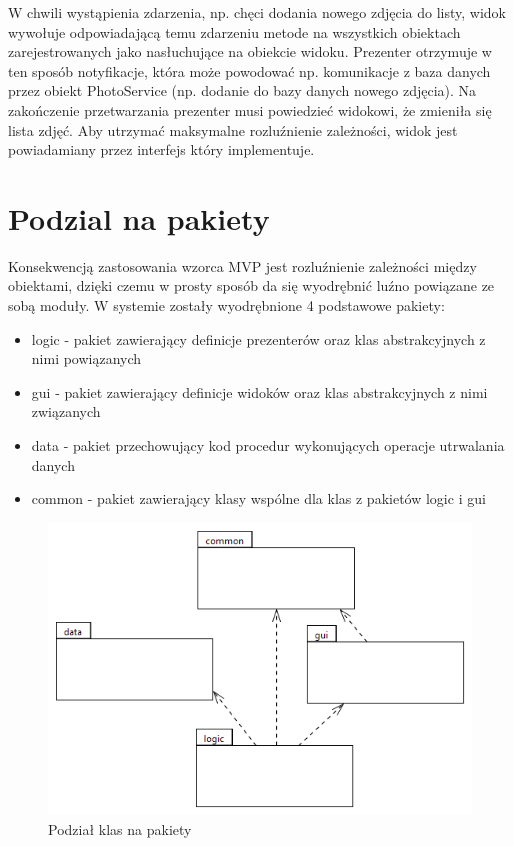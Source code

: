 W chwili wystąpienia zdarzenia, np. chęci dodania nowego zdjęcia do listy, widok wywołuje odpowiadającą temu zdarzeniu metode na wszystkich obiektach zarejestrowanych jako nasłuchujące na obiekcie widoku. Prezenter otrzymuje w ten sposób notyfikacje, która może powodować np. komunikacje z baza danych przez obiekt PhotoService (np. dodanie do bazy danych nowego zdjęcia). Na zakończenie przetwarzania prezenter musi powiedzieć widokowi, że zmieniła się lista zdjęć. Aby utrzymać maksymalne rozluźnienie zależności, widok jest powiadamiany przez interfejs który implementuje.

\section{Podzial na pakiety}
Konsekwencją zastosowania wzorca MVP jest rozluźnienie zależności między obiektami, dzięki czemu w prosty sposób da się wyodrębnić luźno powiązane ze sobą moduły. W systemie zostały wyodrębnione 4 podstawowe pakiety:
\begin{itemize}
\item logic - pakiet zawierający definicje prezenterów oraz klas abstrakcyjnych z nimi powiązanych
\item gui - pakiet zawierający definicje widoków oraz klas abstrakcyjnych z nimi związanych
\item data - pakiet przechowujący kod procedur wykonujących operacje utrwalania danych
\item common - pakiet zawierający klasy wspólne dla klas z pakietów logic i gui
\end{itemize}

\begin{figure} [H]
    \begin{center}
	\includegraphics[scale=.6]{img/packageModel.png}
	\caption{Podział klas na pakiety}
	\label{packageModel}
    \end{center}
\end{figure}

